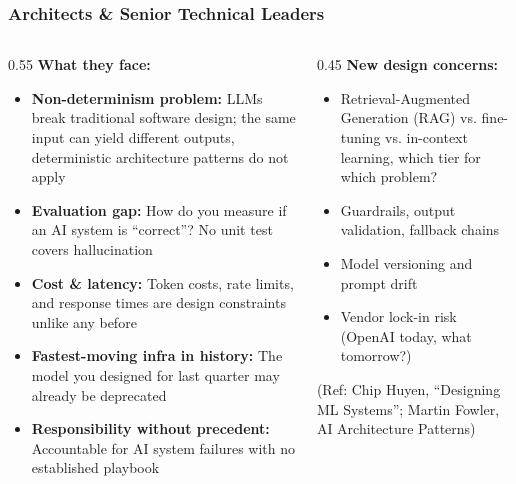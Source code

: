 \begin{frame}[fragile]\frametitle{Architects \& Senior Technical Leaders}

\begin{columns}
    \begin{column}[T]{0.55\linewidth}
\textbf{What they face:}
\begin{itemize}
\item \textbf{Non-determinism problem:} LLMs break traditional software design; the same input can yield different outputs, deterministic architecture patterns do not apply
\item \textbf{Evaluation gap:} How do you measure if an AI system is ``correct''? No unit test covers hallucination
\item \textbf{Cost \& latency:} Token costs, rate limits, and response times are design constraints unlike any before
\item \textbf{Fastest-moving infra in history:} The model you designed for last quarter may already be deprecated
\item \textbf{Responsibility without precedent:} Accountable for AI system failures with no established playbook
\end{itemize}
    \end{column}
    \begin{column}[T]{0.45\linewidth}
\textbf{New design concerns:}

\begin{itemize}
\item Retrieval-Augmented Generation (RAG) vs. fine-tuning vs. in-context learning, which tier for which problem?
\item Guardrails, output validation, fallback chains
\item Model versioning and prompt drift
\item Vendor lock-in risk (OpenAI today, what tomorrow?)
\end{itemize}

\vspace{0.2cm}
{\tiny (Ref: Chip Huyen, ``Designing ML Systems''; Martin Fowler, AI Architecture Patterns)}
    \end{column}
\end{columns}

\end{frame}


